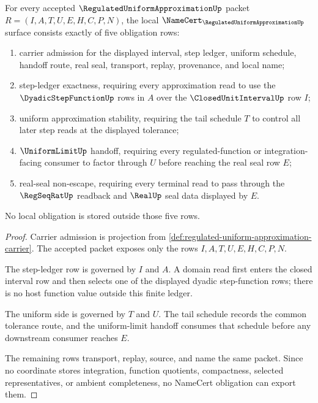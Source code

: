 \begin{theorem}
\label{thm:regulated-uniform-approximation-namecert-obligations}
For every accepted $\RegulatedUniformApproximationUp$ packet $R=(I,A,T,U,E,H,C,P,N)$, the local $\NameCert_{\RegulatedUniformApproximationUp}$ surface consists exactly of five obligation rows:
\begin{enumerate}
\item carrier admission for the displayed interval, step ledger, uniform schedule, handoff route, real seal, transport, replay, provenance, and local name;
\item step-ledger exactness, requiring every approximation read to use the $\DyadicStepFunctionUp$ rows in $A$ over the $\ClosedUnitIntervalUp$ row $I$;
\item uniform approximation stability, requiring the tail schedule $T$ to control all later step reads at the displayed tolerance;
\item $\UniformLimitUp$ handoff, requiring every regulated-function or integration-facing consumer to factor through $U$ before reaching the real seal row $E$;
\item real-seal non-escape, requiring every terminal read to pass through the $\RegSeqRatUp$ readback and $\RealUp$ seal data displayed by $E$.
\end{enumerate}
No local obligation is stored outside those five rows.
\end{theorem}
\begin{proof}
Carrier admission is projection from \autoref{def:regulated-uniform-approximation-carrier}. The accepted packet exposes only the rows $I,A,T,U,E,H,C,P,N$.

The step-ledger row is governed by $I$ and $A$. A domain read first enters the closed interval row and then selects one of the displayed dyadic step-function rows; there is no host function value outside this finite ledger.

The uniform side is governed by $T$ and $U$. The tail schedule records the common tolerance route, and the uniform-limit handoff consumes that schedule before any downstream consumer reaches $E$.

The remaining rows transport, replay, source, and name the same packet. Since no coordinate stores integration, function quotients, compactness, selected representatives, or ambient completeness, no NameCert obligation can export them.
\end{proof}

